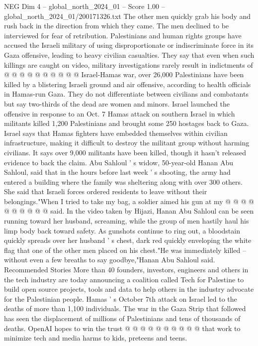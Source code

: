 \begin{textsample}{NEG Dim 4 – global\_north\_2024\_01 – Score 1.00 – global\_north\_2024\_01/200171326.txt}
The other men quickly grab his body and rush back in the direction from which they came.
The men declined to be interviewed for fear of retribution.
Palestinians and human rights groups have accused the Israeli military of using disproportionate or indiscriminate force in its Gaza offensive, leading to heavy civilian casualties.
They say that even when such killings are caught on video, military investigations rarely result in indictments of @ @ @ @ @ @ @ @ @ @ Israel-Hamas war, over 26,000 Palestinians have been killed by a blistering Israeli ground and air offensive, according to health officials in Hamas-run Gaza.
They do not differentiate between civilians and combatants but say two-thirds of the dead are women and minors.
Israel launched the offensive in response to an Oct. 7 Hamas attack on southern Israel in which militants killed 1,200 Palestinians and brought some 250 hostages back to Gaza.
Israel says that Hamas fighters have embedded themselves within civilian infrastructure, making it difficult to destroy the militant group without harming civilians.
It says over 9,000 militants have been killed, though it hasn't released evidence to back the claim.
Abu Sahloul ' s widow, 50-year-old Hanan Abu Sahloul, said that in the hours before last week ' s shooting, the army had entered a building where the family was sheltering along with over 300 others.
She said that Israeli forces ordered residents to leave without their belongings."When I tried to take my bag, a soldier aimed his gun at my @ @ @ @ @ @ @ @ @ @ said.
In the video taken by Hijazi, Hanan Abu Sahloul can be seen running toward her husband, screaming, while the group of men hastily haul his limp body back toward safety.
As gunshots continue to ring out, a bloodstain quickly spreads over her husband ' s chest, dark red quickly enveloping the white flag that one of the other men placed on his chest."He was immediately killed -- without even a few breaths to say goodbye,"Hanan Abu Sahloul said.
Recommended Stories More than 40 founders, investors, engineers and others in the tech industry are today announcing a coalition called Tech for Palestine to build open source projects, tools and data to help others in the industry advocate for the Palestinian people.
Hamas ' s October 7th attack on Israel led to the deaths of more than 1,100 individuals.
The war in the Gaza Strip that followed has seen the displacement of millions of Palestinians and tens of thousands of deaths.
OpenAI hopes to win the trust @ @ @ @ @ @ @ @ @ @ that work to minimize tech and media harms to kids, preteens and teens.

\end{textsample}
